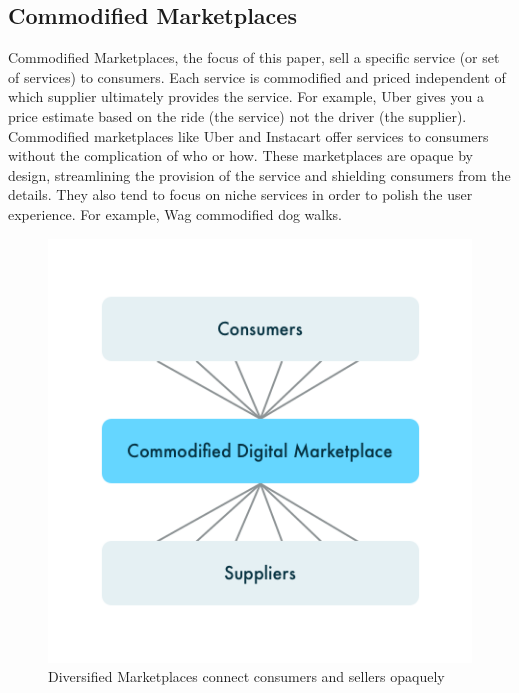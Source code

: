 \subsection{Commodified Marketplaces}
Commodified Marketplaces, the focus of this paper, sell a specific service (or set of services) to consumers. Each service is commodified and priced independent of which supplier ultimately provides the service. For example, Uber gives you a price estimate based on the ride (the service) not the driver (the supplier). Commodified marketplaces like Uber and Instacart offer services to consumers without the complication of who or how. These marketplaces are opaque by design, streamlining the provision of the service and shielding consumers from the details. They also tend to focus on niche services in order to polish the user experience. For example, Wag commodified dog walks.
\begin{figure}[ht!]
\begin{center}
\includegraphics[scale=0.5]{figures/commodified.png}
\end{center}
\caption[Commodified Marketplaces]{Diversified Marketplaces connect consumers and sellers opaquely}
\label{commodified_marketplace}
\end{figure}  

